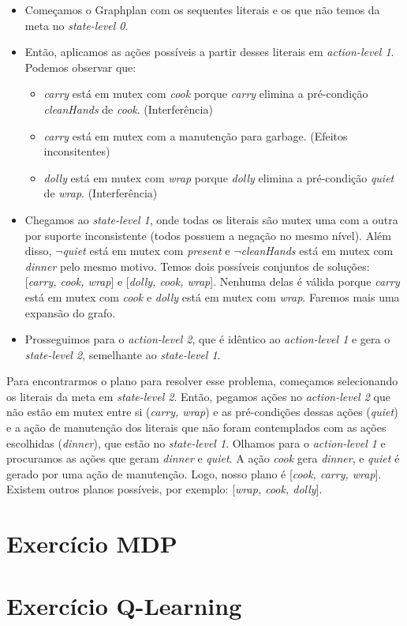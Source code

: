 \documentclass[12pt,letterpaper]{article}
\begin{document}
	\begin{itemize}
		\item Começamos o Graphplan com os sequentes literais e os que não temos da meta no \textit{state-level 0}.
		\item Então, aplicamos as ações possíveis a partir desses literais em \textit{action-level 1}. Podemos observar que:
		\begin{itemize}
			\item \textit{carry} está em mutex com \textit{cook} porque \textit{carry} elimina a pré-condição \textit{cleanHands} de \textit{cook}. (Interferência)
			\item \textit{carry} está em mutex com a manutenção para garbage. (Efeitos inconsitentes)
			\item \textit{dolly} está em mutex com \textit{wrap} porque \textit{dolly} elimina a pré-condição \textit{quiet} de \textit{wrap}. (Interferência)
		\end{itemize}
		\item Chegamos ao \textit{state-level 1}, onde todas os literais são mutex uma com a outra por suporte inconsistente (todos possuem a negação no mesmo nível). Além disso, \textit{$\lnot$quiet} está em mutex com \textit{present} e \textit{$\lnot$cleanHands} está em mutex com \textit{dinner} pelo mesmo motivo. Temos dois possíveis conjuntos de soluções: [\textit{carry, cook, wrap}] e [\textit{dolly, cook, wrap}]. Nenhuma delas é válida porque \textit{carry} está em mutex com \textit{cook} e \textit{dolly} está em mutex com \textit{wrap}. Faremos mais uma expansão do grafo.
		\item Prosseguimos para o \textit{action-level 2}, que é idêntico ao \textit{action-level 1} e gera o \textit{state-level 2}, semelhante ao \textit{state-level 1}.
	\end{itemize}

	Para encontrarmos o plano para resolver esse problema, começamos selecionando os literais da meta em \textit{state-level 2}. Então, pegamos ações no \textit{action-level 2} que não estão em mutex entre si (\textit{carry, wrap}) e as pré-condições dessas ações (\textit{quiet}) e a ação de manutenção dos literais que não foram contemplados com as ações escolhidas (\textit{dinner}), que estão no \textit{state-level 1}. Olhamos para o \textit{action-level 1} e procuramos as ações que geram \textit{dinner} e \textit{quiet}. A ação \textit{cook} gera \textit{dinner}, e \textit{quiet} é gerado por uma ação de manutenção. Logo, nosso plano é [\textit{cook, carry, wrap}]. Existem outros planos possíveis, por exemplo: [\textit{wrap, cook, dolly}].    

	\section*{Exercício MDP}

	\section*{Exercício Q-Learning}
\end{document}
